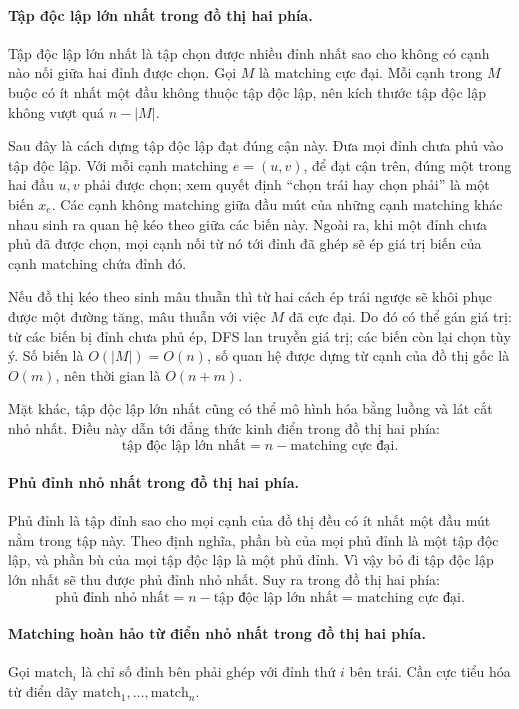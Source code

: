 \documentclass[11pt]{article}
\begin{document}
\paragraph{Tập độc lập lớn nhất trong đồ thị hai phía.}
Tập độc lập lớn nhất là tập chọn được nhiều đỉnh nhất sao cho không có cạnh nào
nối giữa hai đỉnh được chọn. Gọi \(M\) là matching cực đại. Mỗi cạnh trong
\(M\) buộc có ít nhất một đầu không thuộc tập độc lập, nên kích thước tập độc
lập không vượt quá \(n-|M|\).

Sau đây là cách dựng tập độc lập đạt đúng cận này. Đưa mọi đỉnh chưa phủ vào
tập độc lập. Với mỗi cạnh matching \(e=(u,v)\), để đạt cận trên, đúng một trong
hai đầu \(u,v\) phải được chọn; xem quyết định ``chọn trái hay chọn phải'' là
một biến \(x_e\). Các cạnh không matching giữa đầu mút của những cạnh matching
khác nhau sinh ra quan hệ kéo theo giữa các biến này. Ngoài ra, khi một đỉnh
chưa phủ đã được chọn, mọi cạnh nối từ nó tới đỉnh đã ghép sẽ ép giá trị biến
của cạnh matching chứa đỉnh đó.

Nếu đồ thị kéo theo sinh mâu thuẫn thì từ hai cách ép trái ngược sẽ khôi phục
được một đường tăng, mâu thuẫn với việc \(M\) đã cực đại. Do đó có thể gán giá
trị: từ các biến bị đỉnh chưa phủ ép, DFS lan truyền giá trị; các biến còn lại
chọn tùy ý. Số biến là \(O(|M|)=O(n)\), số quan hệ được dựng từ cạnh của đồ thị
gốc là \(O(m)\), nên thời gian là \(O(n+m)\).

Mặt khác, tập độc lập lớn nhất cũng có thể mô hình hóa bằng luồng và lát cắt
nhỏ nhất. Điều này dẫn tới đẳng thức kinh điển trong đồ thị hai phía:
\[
  \text{tập độc lập lớn nhất}=n-\text{matching cực đại}.
\]

\paragraph{Phủ đỉnh nhỏ nhất trong đồ thị hai phía.}
Phủ đỉnh là tập đỉnh sao cho mọi cạnh của đồ thị đều có ít nhất một đầu mút nằm
trong tập này. Theo định nghĩa, phần bù của mọi phủ đỉnh là một tập độc lập, và
phần bù của mọi tập độc lập là một phủ đỉnh. Vì vậy bỏ đi tập độc lập lớn nhất
sẽ thu được phủ đỉnh nhỏ nhất. Suy ra trong đồ thị hai phía:
\[
  \text{phủ đỉnh nhỏ nhất}=n-\text{tập độc lập lớn nhất}
  =\text{matching cực đại}.
\]

\paragraph{Matching hoàn hảo từ điển nhỏ nhất trong đồ thị hai phía.}
Gọi \(\mathrm{match}_i\) là chỉ số đỉnh bên phải ghép với đỉnh thứ \(i\) bên
trái. Cần cực tiểu hóa từ điển dãy \(\mathrm{match}_1,\ldots,\mathrm{match}_n\).
\end{document}
